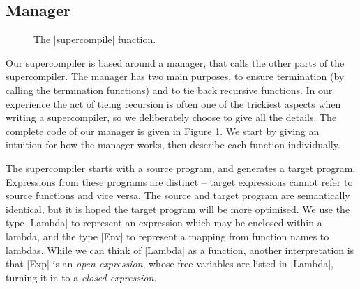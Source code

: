 \documentclass{sigplanconf}
\begin{document}
\subsection{Manager}
\label{sec:manager}

\begin{figure}
\caption{The |supercompile| function.}
\label{fig:manager}
\end{figure}

Our supercompiler is based around a manager, that calls the other parts of the supercompiler. The manager has two main purposes, to ensure termination (by calling the termination functions) and to tie back recursive functions. In our experience the act of tieing recursion is often one of the trickiest aspects when writing a supercompiler, so we deliberately choose to give all the details. The complete code of our manager is given in Figure \ref{fig:manager}. We start by giving an intuition for how the manager works, then describe each function individually.

The supercompiler starts with a source program, and generates a target program. Expressions from these programs are distinct -- target expressions cannot refer to source functions and vice versa. The source and target program are semantically identical, but it is hoped the target program will be more optimised. We use the type |Lambda| to represent an expression which may be enclosed within a lambda, and the type |Env| to represent a mapping from function names to lambdas. While we can think of |Lambda| as a function, another interpretation is that |Exp| is an \textit{open expression}, whose free variables are listed in |Lambda|, turning it in to a \textit{closed expression}.
\end{document}
